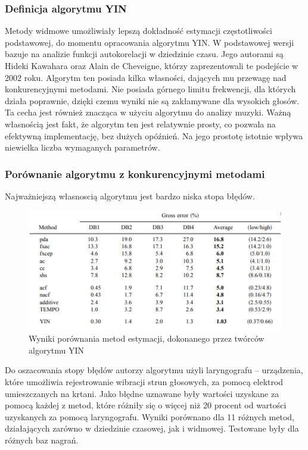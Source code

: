 \documentclass[a4paper,12 pt]{article}
\begin{document}
\subsubsection{Definicja algorytmu YIN}

Metody widmowe umożliwiały lepszą dokładność estymacji częstotliwości podstawowej, do momentu opracowania algorytmu YIN. W podstawowej wersji bazuje na analizie funkcji autokorelacji w dziedzinie czasu. Jego autorami są Hideki Kawahara oraz Alain de Cheveigne, którzy zaprezentowali te podejście w 2002 roku. Algorytm ten posiada kilka własności, dających mu przewagę nad konkurencyjnymi metodami. Nie posiada górnego limitu frekwencji, dla których działa poprawnie, dzięki czemu wyniki nie są zakłamywane dla wysokich głosów. Ta cecha jest również znacząca w użyciu algorytmu do analizy muzyki. Ważną własnością jest fakt, że algorytm ten jest relatywnie prosty, co pozwala na efektywną implementację, bez dużych opóźnień. Na jego prostotę istotnie wpływa niewielka liczba wymaganych parametrów.

\subsubsection{Porównanie algorytmu z konkurencyjnymi metodami}
Najważniejszą własnoscią algorytmu jest bardzo niska stopa błędów.
\begin{figure}[h]

\centering
\includegraphics{porownanie_metod.png}
\caption{Wyniki porównania metod estymacji, dokonanego przez twórców algorytmu YIN}

\end{figure}
\FloatBarrier

 Do oszacowania stopy błędów autorzy algorytmu użyli laryngografu – urządzenia, które umożliwia rejestrowanie wibracji strun głosowych, za pomocą elektrod umieszczanych na krtani. Jako błędne uznawane były wartości uzyskane za pomocą każdej z metod, które różniły się o więcej niż 20 procent od wartości uzyskanych za pomocą laryngografu. Wyniki porównano dla 11 różnych metod, działających zarówno w dziedzinie czasowej, jak i widmowej. Testowane były dla różnych baz nagrań. 
\end{document}
